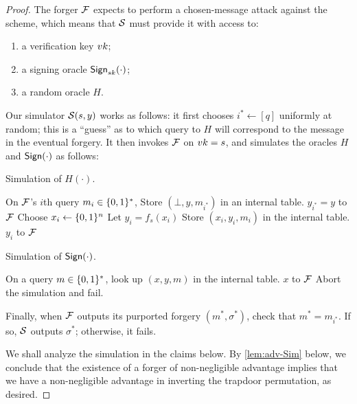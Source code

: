 \documentclass[11pt]{article}
\begin{document}
\begin{proof}
  The forger $\mathcal{F}$ expects to perform a chosen-message attack against
  the scheme, which means that $\mathcal{S}$ must provide it with access to:
  \begin{enumerate}
  \item a verification key $vk$;
  \item a signing oracle $\mathsf{Sign}_{sk}(\cdot)$;
  \item a random oracle $H$.
  \end{enumerate}

  Our simulator $\mathcal{S}(s,y)$ works as follows: it first chooses $i^*
  \gets [q]$ uniformly at random; this is a ``guess'' as to which
  query to $H$ will correspond to the message in the eventual forgery.
  It then invokes $\mathcal{F}$ on $vk = s$, and simulates the oracles $H$
  and $\mathsf{Sign}(\cdot)$ as follows:

  \begin{algorithm}
    \caption{Simulation of $H(\cdot)$.}
    \begin{algorithmic}[1]
      \STATE On $\mathcal{F}$'s $i$th query $m_{i} \in \{0,1\}^{*}$,
      \STATE Store $(\bot, y, m_{i^{*}})$ in an internal table.
      \RETURN $y_{i^*}=y$ to $\mathcal{F}$
      \ELSE 
      \STATE Choose $x_i\gets \{0,1\}^n$
      \STATE Let $y_i=f_s(x_i)$
      \STATE Store $(x_i,y_i,m_i)$ in the internal table.
      \RETURN $y_i$ to $\mathcal{F}$
      \ENDIF
    \end{algorithmic}
  \end{algorithm}

  \begin{algorithm}
  \caption{Simulation of $\mathsf{Sign}(\cdot)$.}
  \begin{algorithmic}[1]
  \STATE On a query $m \in \{0,1\}^{*}$, look up $(x,y,m)$ in the
  internal table.
  \RETURN $x$ to $\mathcal{F}$
  \ELSE
  \STATE Abort the simulation and fail.
  \ENDIF
  \end{algorithmic}
  \end{algorithm}

  Finally, when $\mathcal{F}$ outputs its purported forgery $(m^*,\sigma^*)$,
  check that $m^*=m_{i^*}$.  If so, $\mathcal{S}$ outputs $\sigma^*$;
  otherwise, it fails.

  We shall analyze the simulation in the claims below.  By
  \cref{lem:adv-Sim} below, we conclude that the existence of a
  forger of non-negligible advantage implies that we have a
  non-negligible advantage in inverting the trapdoor permutation, as
  desired.
\end{proof}
\end{document}
